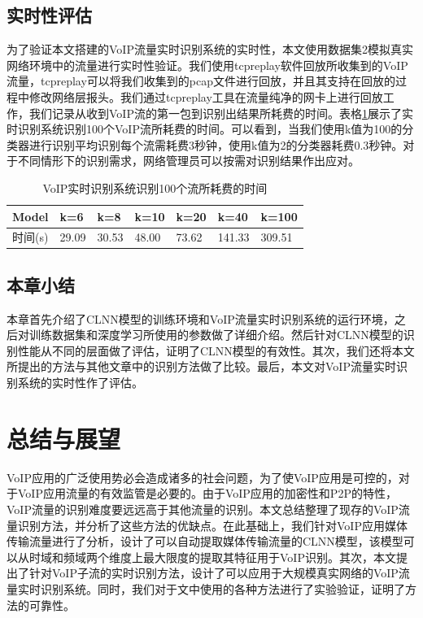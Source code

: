 \section{实时性评估}
为了验证本文搭建的VoIP流量实时识别系统的实时性，本文使用数据集2模拟真实网络环境中的流量进行实时性验证。我们使用tcpreplay软件回放所收集到的VoIP流量，tcpreplay可以将我们收集到的pcap文件进行回放，并且其支持在回放的过程中修改网络层报头。我们通过tcpreplay工具在流量纯净的网卡上进行回放工作，我们记录从收到VoIP流的第一包到识别出结果所耗费的时间。表格\ref{tab:time4folws}展示了实时识别系统识别100个VoIP流所耗费的时间。可以看到，当我们使用k值为100的分类器进行识别平均识别每个流需耗费3秒钟，使用k值为2的分类器耗费0.3秒钟。对于不同情形下的识别需求，网络管理员可以按需对识别结果作出应对。

\begin{table}
  \caption{VoIP实时识别系统识别100个流所耗费的时间}
  \label{tab:time4folws}
  \centering
  \begin{tabular}{l l l l l l l }
    \hline
    \textbf{Model} &\textbf{k=6}&\textbf{k=8}&\textbf{k=10}&\textbf{k=20}&\textbf{k=40}&\textbf{k=100}\\
    \hline
    时间(s)      &29.09&30.53&48.00&73.62&141.33&309.51  \\
    \hline
  \end{tabular}
\end{table}

\section{本章小结}
本章首先介绍了CLNN模型的训练环境和VoIP流量实时识别系统的运行环境，之后对训练数据集和深度学习所使用的参数做了详细介绍。然后针对CLNN模型的识别性能从不同的层面做了评估，证明了CLNN模型的有效性。其次，我们还将本文所提出的方法与其他文章中的识别方法做了比较。最后，本文对VoIP流量实时识别系统的实时性作了评估。



\chapter{总结与展望}
VoIP应用的广泛使用势必会造成诸多的社会问题，为了使VoIP应用是可控的，对于VoIP应用流量的有效监管是必要的。由于VoIP应用的加密性和P2P的特性，VoIP流量的识别难度要远远高于其他流量的识别。本文总结整理了现存的VoIP流量识别方法，并分析了这些方法的优缺点。在此基础上，我们针对VoIP应用媒体传输流量进行了分析，设计了可以自动提取媒体传输流量的CLNN模型，该模型可以从时域和频域两个维度上最大限度的提取其特征用于VoIP识别。其次，本文提出了针对VoIP子流的实时识别方法，设计了可以应用于大规模真实网络的VoIP流量实时识别系统。同时，我们对于文中使用的各种方法进行了实验验证，证明了方法的可靠性。


